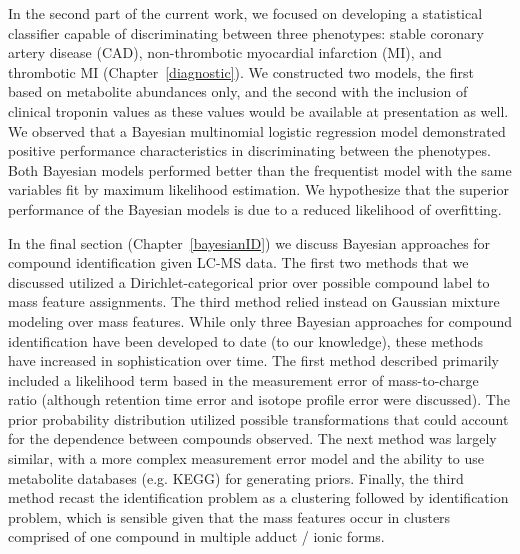 \begin{DoubleSpace*}
In the second part of the current work, we focused on developing a statistical classifier capable of discriminating between three phenotypes: stable coronary artery disease (CAD), non-thrombotic myocardial infarction (MI), and thrombotic MI (Chapter~\ref{diagnostic}). We constructed two models, the first based on metabolite abundances only, and the second with the inclusion of clinical troponin values as these values would be available at presentation as well. We observed that a Bayesian multinomial logistic regression model demonstrated positive performance characteristics in discriminating between the phenotypes. Both Bayesian models performed better than the frequentist model with the same variables fit by maximum likelihood estimation. We hypothesize that the superior performance of the Bayesian models is due to a reduced likelihood of overfitting. 

In the final section (Chapter~\ref{bayesianID}) we discuss Bayesian approaches for compound identification given LC-MS data. The first two methods that we discussed utilized a Dirichlet-categorical prior over possible compound label to mass feature assignments. The third method relied instead on Gaussian mixture modeling over mass features. While only three Bayesian approaches for compound identification have been developed to date (to our knowledge), these methods have increased in sophistication over time. The first method described primarily included a likelihood term based in the measurement error of mass-to-charge ratio (although retention time error and isotope profile error were discussed). The prior probability distribution utilized possible transformations that could account for the dependence between compounds observed. The next method was largely similar, with a more complex measurement error model and the ability to use metabolite databases (e.g. KEGG) for generating priors. Finally, the third method recast the identification problem as a clustering followed by identification problem, which is sensible given that the mass features occur in clusters comprised of one compound in multiple adduct / ionic forms. 


\end{DoubleSpace*}
